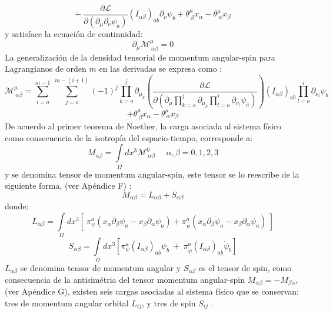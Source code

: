 \documentclass[a4paper,12pt]{article}
\begin{document}
$$+\ \frac{\partial\mathscr{L} }{\partial(\partial_{\mu}\partial_{\nu} \psi_a)}(I_{\alpha\beta})_{ab}\partial_\nu\psi_{b}+\theta_{\ \beta}^\mu x_\alpha-\theta_{\ \alpha}^\mu x_\beta $$
y satisface la ecuación de continuidad:
\begin{equation}
\partial_\mu \mathscr{M}^{\mu}_{\ \alpha\beta}=0
\label{contenmo}
\end{equation}
La generalización de la densidad tensorial de momentum angular-spin para Lagrangianos de orden $m$ en las derivadas se expresa como \cite{general}:
{\small
\begin{equation}
\mathscr{M}_{\ \alpha\beta}^\mu=\sum\limits_{i=o}^{m-1}\ \sum\limits_{j=o}^{m-(i+1)}(-1)^j\prod\limits_{k=o}^{j}\partial_{\mu_k}\left(\frac{\partial\mathscr{L}}{\partial\left(\partial_\mu\prod\limits_{k=o}^{j}\partial_{\mu_k}\prod\limits_{l=o}^{i}\partial_{\nu_l}\psi_a\right)}\right)(I_{\alpha\beta})_{ab}\prod\limits_{l=o}^{i}\partial_{\nu_l}\psi_b 
\end{equation}}
$$+\theta_{\ \beta}^\mu x_\alpha-\theta_{\ \alpha}^\mu x_\beta$$
De acuerdo al primer teorema de Noether, la carga asociada al sistema físico como consecuencia de la isotropía del \mbox{espacio-tiempo,} corresponde a: 
\begin{equation}
M_{\alpha\beta}=\int\limits_{\Omega}dx^{3}\mathscr{M}_{\ \alpha\beta}^{0}\ \ \ \ \ \ \alpha,\beta=0,1,2,3 
\end{equation}
y se denomina tensor de momentum angular-spin, este tensor se lo reescribe de la siguiente forma, (ver Apéndice F) \cite{greiner}: 
\begin{equation}
M_{\alpha\beta}=L_{\alpha\beta}+S_{\alpha\beta} 
\label{angular}
\end{equation}
donde:
\begin{equation}
L_{\alpha\beta}=\int\limits_{\Omega}dx^{3}[\ \pi^{a}_{\psi}(x_{\alpha}\partial_{\beta}\psi_a-x_{\beta}\partial_{\alpha}\psi_a)+\pi^{a}_{\dot\psi}(x_{\alpha}\partial_{\beta}\dot\psi_a-x_{\beta}\partial_{\alpha}\dot\psi_a)  \  ] 
\label{orbitalm}
\end{equation}
\begin{equation}
S_{\alpha\beta}=\int\limits_{\Omega}dx^{3}\left[\pi^{a}_{\psi}(I_{\alpha\beta})_{ab}\psi_{b}\ +\ \pi^{a}_{\dot\psi}(I_{\alpha\beta})_{ab}\dot\psi_b\right]
\label{spin}  
\end{equation}
$L_{\alpha\beta}$ se denomina tensor de momentum angular y $S_{\alpha\beta}$ es el tensor de spin, como consecuencia de la antisimétria del tensor momentum angular-spin $M_{\alpha\beta}=-M_{\beta\alpha}$, (ver Apéndice G), existen seis cargas asociadas al sistema físico que se conservan: tres de momentum angular orbital $L_{ij}$, y tres de spin $S_{ij}$ \cite{greiner}.
\\
\end{document}
